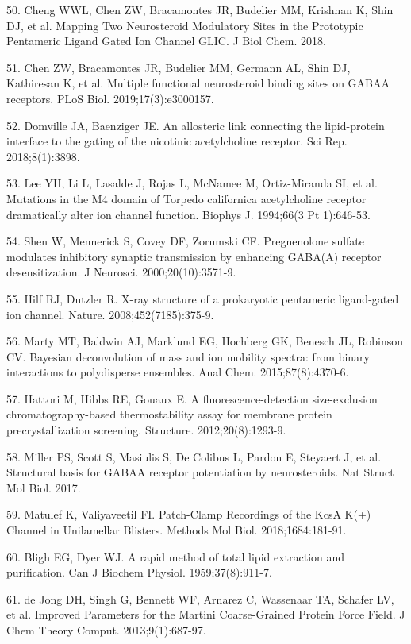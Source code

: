 50. Cheng WWL, Chen ZW, Bracamontes JR, Budelier MM, Krishnan K, Shin
DJ, et al. Mapping Two Neurosteroid Modulatory Sites in the Prototypic
Pentameric Ligand Gated Ion Channel GLIC. J Biol Chem. 2018.

51. Chen ZW, Bracamontes JR, Budelier MM, Germann AL, Shin DJ,
Kathiresan K, et al. Multiple functional neurosteroid binding sites on
GABAA receptors. PLoS Biol. 2019;17(3):e3000157.

52. Domville JA, Baenziger JE. An allosteric link connecting the
lipid-protein interface to the gating of the nicotinic acetylcholine
receptor. Sci Rep. 2018;8(1):3898.

53. Lee YH, Li L, Lasalde J, Rojas L, McNamee M, Ortiz-Miranda SI, et
al. Mutations in the M4 domain of Torpedo californica acetylcholine
receptor dramatically alter ion channel function. Biophys J. 1994;66(3
Pt 1):646-53.

54. Shen W, Mennerick S, Covey DF, Zorumski CF. Pregnenolone sulfate
modulates inhibitory synaptic transmission by enhancing GABA(A) receptor
desensitization. J Neurosci. 2000;20(10):3571-9.

55. Hilf RJ, Dutzler R. X-ray structure of a prokaryotic pentameric
ligand-gated ion channel. Nature. 2008;452(7185):375-9.

56. Marty MT, Baldwin AJ, Marklund EG, Hochberg GK, Benesch JL, Robinson
CV. Bayesian deconvolution of mass and ion mobility spectra: from binary
interactions to polydisperse ensembles. Anal Chem. 2015;87(8):4370-6.

57. Hattori M, Hibbs RE, Gouaux E. A fluorescence-detection
size-exclusion chromatography-based thermostability assay for membrane
protein precrystallization screening. Structure. 2012;20(8):1293-9.

58. Miller PS, Scott S, Masiulis S, De Colibus L, Pardon E, Steyaert J,
et al. Structural basis for GABAA receptor potentiation by
neurosteroids. Nat Struct Mol Biol. 2017.

59. Matulef K, Valiyaveetil FI. Patch-Clamp Recordings of the KcsA K(+)
Channel in Unilamellar Blisters. Methods Mol Biol. 2018;1684:181-91.

60. Bligh EG, Dyer WJ. A rapid method of total lipid extraction and
purification. Can J Biochem Physiol. 1959;37(8):911-7.

61. de Jong DH, Singh G, Bennett WF, Arnarez C, Wassenaar TA, Schafer
LV, et al. Improved Parameters for the Martini Coarse-Grained Protein
Force Field. J Chem Theory Comput. 2013;9(1):687-97.


